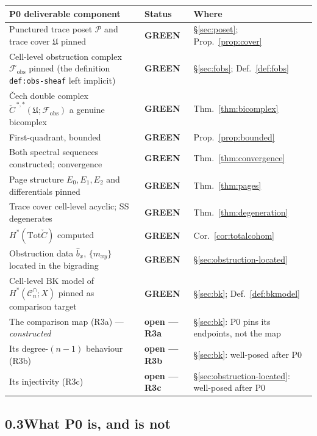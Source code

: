 \documentclass[11pt,oneside]{amsart}
\theoremstyle{plain}
\theoremstyle{definition}
\theoremstyle{remark}
\theoremstyle{honeststyle}
\newcommand{\Cn}{\mathcal{C}^{\cap}_n}
\newcommand{\BK}{\mathrm{BK}}
\newcommand{\Tot}{\mathrm{Tot}}
\newcommand{\fobs}{\mathcal{F}_{\mathrm{obs}}}
\newcommand{\Pp}{\mathcal{P}}
\newcommand{\Uf}{\mathfrak{U}}
\newcommand{\Ccheck}{\check{C}}
\begin{document}
{\small
\renewcommand{\arraystretch}{1.25}
\begin{longtable}{p{}p{}p{}}
\toprule
\textbf{P0 deliverable component} & \textbf{Status} & \textbf{Where} \\
\midrule
Punctured trace poset $\Pp$ and trace cover $\Uf$ pinned
  & \textbf{GREEN} & \S\ref{sec:poset}; Prop.~\ref{prop:cover} \\
Cell-level obstruction complex $\fobs$ pinned (the definition
  \texttt{def:obs-sheaf} left implicit)
  & \textbf{GREEN} & \S\ref{sec:fobs}; Def.~\ref{def:fobs} \\
\v{C}ech double complex $\Ccheck^{\,*,*}(\Uf;\fobs)$ a genuine
  bicomplex
  & \textbf{GREEN} & Thm.~\ref{thm:bicomplex} \\
First-quadrant, bounded
  & \textbf{GREEN} & Prop.~\ref{prop:bounded} \\
Both spectral sequences constructed; convergence
  & \textbf{GREEN} & Thm.~\ref{thm:convergence} \\
Page structure $E_{0},E_{1},E_{2}$ and differentials pinned
  & \textbf{GREEN} & Thm.~\ref{thm:pages} \\
Trace cover cell-level acyclic; SS degenerates
  & \textbf{GREEN} & Thm.~\ref{thm:degeneration} \\
$H^{*}(\Tot\Ccheck)$ computed
  & \textbf{GREEN} & Cor.~\ref{cor:totalcohom} \\
Obstruction data $\widehat b_{x}$, $\{m_{xy}\}$ located in the
  bigrading
  & \textbf{GREEN} & \S\ref{sec:obstruction-located} \\
Cell-level $\BK$ model of $H^{*}(\Cn;X)$ pinned as comparison target
  & \textbf{GREEN} & \S\ref{sec:bk}; Def.~\ref{def:bkmodel} \\
The comparison map (R3a) --- \emph{constructed}
  & \textbf{open --- R3a} & \S\ref{sec:bk}: P0 pins its endpoints, not the map \\
Its degree-$(n-1)$ behaviour (R3b)
  & \textbf{open --- R3b} & \S\ref{sec:bk}: well-posed after P0 \\
Its injectivity (R3c)
  & \textbf{open --- R3c} & \S\ref{sec:obstruction-located}: well-posed after P0 \\
\bottomrule
\end{longtable}}

\subsection*{0.3\quad What P0 is, and is not}
\end{document}
